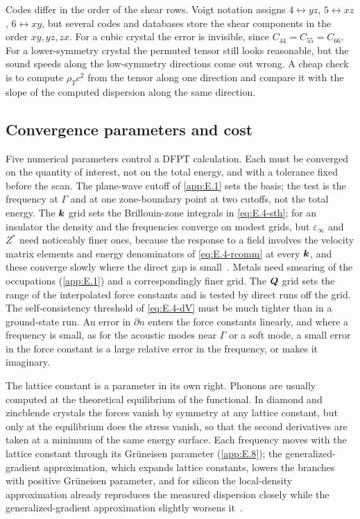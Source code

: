 Codes differ in the order of the shear rows. Voigt notation assigns $4 \leftrightarrow yz$, $5 \leftrightarrow xz$, $6 \leftrightarrow xy$, but several codes and databases store the shear components in the order $xy, yz, zx$. For a cubic crystal the error is invisible, since $C_{44} = C_{55} = C_{66}$. For a lower-symmetry crystal the permuted tensor still looks reasonable, but the sound speeds along the low-symmetry directions come out wrong. A cheap check is to compute $\rho_Tc^2$ from the tensor along one direction and compare it with the slope of the computed dispersion along the same direction.

\subsection{Convergence parameters and cost}

Five numerical parameters control a DFPT calculation. Each must be converged on the quantity of interest, not on the total energy, and with a tolerance fixed before the scan. The plane-wave cutoff of \cref{app:E.1} sets the basis; the test is the frequency at $\Gamma$ and at one zone-boundary point at two cutoffs, not the total energy. The $\bm{k}$ grid sets the Brillouin-zone integrals in \cref{eq:E.4-sth}; for an insulator the density and the frequencies converge on modest grids, but $\varepsilon_\infty$ and $Z^*$ need noticeably finer ones, because the response to a field involves the velocity matrix elements and energy denominators of \cref{eq:E.4-rcomm} at every $\bm{k}$, and these converge slowly where the direct gap is small~\cite[Sect.~II.C.2]{baroni2001phonons}. Metals need smearing of the occupations (\cref{app:E.1}) and a correspondingly finer grid. The $\bm{Q}$ grid sets the range of the interpolated force constants and is tested by direct runs off the grid. The self-consistency threshold of \cref{eq:E.4-dV} must be much tighter than in a ground-state run. An error in $\partial n$ enters the force constants linearly, and where a frequency is small, as for the acoustic modes near $\Gamma$ or a soft mode, a small error in the force constant is a large relative error in the frequency, or makes it imaginary.

The lattice constant is a parameter in its own right. Phonons are usually computed at the theoretical equilibrium of the functional. In diamond and zincblende crystals the forces vanish by symmetry at any lattice constant, but only at the equilibrium does the stress vanish, so that the second derivatives are taken at a minimum of the same energy surface. Each frequency moves with the lattice constant through its Gr\"uneisen parameter (\cref{app:E.8}); the generalized-gradient approximation, which expands lattice constants, lowers the branches with positive Gr\"uneisen parameter, and for silicon the local-density approximation already reproduces the measured dispersion closely while the generalized-gradient approximation slightly worsens it~\cite[Sect.~V.A]{baroni2001phonons}.

